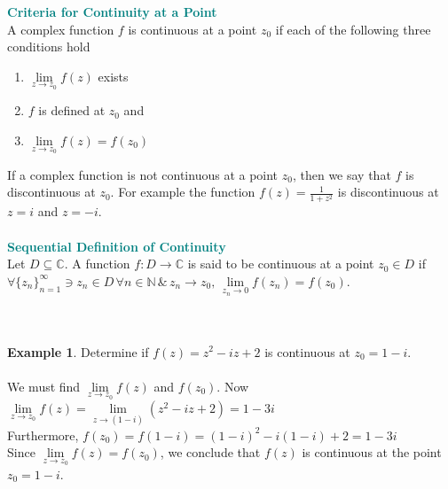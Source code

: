 \documentclass[11pt,a4paper]{article}
\theoremstyle{definition}
\newtheorem{example}[thm]{Example}
\begin{document}
\textbf{\textcolor{teal}{Criteria for Continuity at a Point}}\\
A complex function $f$ is continuous at a point $z_0$ if each of the following three conditions hold
\begin{enumerate}
\item  $\lim\limits_{z\rightarrow z_0}f(z) $ exists
\item $f$ is defined at $z_0$ and
\item  $\lim\limits_{z\rightarrow z_0}f(z) = f(z_0)$\\
\end{enumerate}



If a complex function is not continuous at a point $z_0$, then we say that $f$ is discontinuous at $z_0$. For example the function $f(z) = \frac{1}{1 + z^2}$ is discontinuous at $z  = i$ and $z = -i$.\\\\





\textbf{\textcolor{teal}{Sequential Definition of Continuity}}\\
Let $D\subseteq \mathbb{C}$. A function $f: D\longrightarrow \mathbb{C}$ is said to be continuous at a point $z_0\in D$ if $\forall \{z_n\}^{\infty}_{n = 1}\ni z_n \in D\, \forall n \in \mathbb{N}\,\& \, z_n \longrightarrow z_0, \, \lim\limits_{z_n \rightarrow 0} f(z_n ) = f(z_0)$.\\\\\\




\begin{example}
Determine if $f(z) = z^2 - iz + 2$ is continuous at $z_0 = 1 - i$.\\


\text{\textcolor{red}{Solution}}\\
We must find  $\lim\limits_{z\rightarrow z_0}f(z)$ and    $f(z_0)$. Now\, $\displaystyle{ \lim\limits_{z\rightarrow z_0}f(z) =  \lim\limits_{z\rightarrow (1 - i)}(z^2 - iz + 2) = 1 - 3i}$\\

Furthermore, $f(z_0) = f(1 - i) = (1- i)^2 - i(1 - i) + 2 = 1 - 3i$\\

Since  $\lim\limits_{z\rightarrow z_0}f(z) = f(z_0)$, we conclude that $f(z)$ is continuous at the point $z_0  = 1 -i$.
\end{example}
\end{document}
